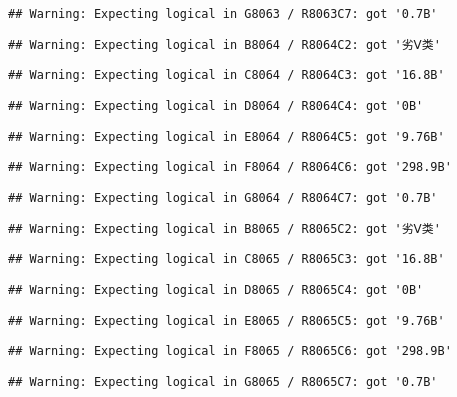 \documentclass[
]{article}
\begin{document}
\begin{verbatim}
## Warning: Expecting logical in G8063 / R8063C7: got '0.7B'
\end{verbatim}

\begin{verbatim}
## Warning: Expecting logical in B8064 / R8064C2: got '劣Ⅴ类'
\end{verbatim}

\begin{verbatim}
## Warning: Expecting logical in C8064 / R8064C3: got '16.8B'
\end{verbatim}

\begin{verbatim}
## Warning: Expecting logical in D8064 / R8064C4: got '0B'
\end{verbatim}

\begin{verbatim}
## Warning: Expecting logical in E8064 / R8064C5: got '9.76B'
\end{verbatim}

\begin{verbatim}
## Warning: Expecting logical in F8064 / R8064C6: got '298.9B'
\end{verbatim}

\begin{verbatim}
## Warning: Expecting logical in G8064 / R8064C7: got '0.7B'
\end{verbatim}

\begin{verbatim}
## Warning: Expecting logical in B8065 / R8065C2: got '劣Ⅴ类'
\end{verbatim}

\begin{verbatim}
## Warning: Expecting logical in C8065 / R8065C3: got '16.8B'
\end{verbatim}

\begin{verbatim}
## Warning: Expecting logical in D8065 / R8065C4: got '0B'
\end{verbatim}

\begin{verbatim}
## Warning: Expecting logical in E8065 / R8065C5: got '9.76B'
\end{verbatim}

\begin{verbatim}
## Warning: Expecting logical in F8065 / R8065C6: got '298.9B'
\end{verbatim}

\begin{verbatim}
## Warning: Expecting logical in G8065 / R8065C7: got '0.7B'
\end{verbatim}
\end{document}
